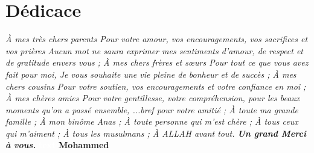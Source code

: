 \chapter*{Dédicace}
\begin{large}
\begin{center}
\centering

\noindent\textit{
À mes très chers parents 
\newline
Pour votre amour, vos encouragements, vos sacrifices et vos prières 
\newline
Aucun mot ne saura exprimer mes sentiments d’amour, de respect et de gratitude envers vous ; 
\newline
À mes chers frères et sœurs 
\newline
Pour tout ce que vous avez fait pour moi, Je vous souhaite une vie pleine de 
\newline
bonheur et de succès ; 
\newline
À mes chers cousins 
\newline
Pour votre soutien, vos encouragements et votre confiance en moi ; 
\newline
À mes chères amies 
\newline
Pour votre gentillesse, votre compréhension, pour les beaux moments qu’on a passé ensemble, ...bref pour votre amitié ; 
\newline
À toute ma grande famille ; 
\newline
À mon binôme Anas ; 
\newline
À toute personne qui m’est chère ; 
\newline
À tous ceux qui m’aiment ; 
\newline
À tous les musulmans ; 
\newline
À ALLAH avant tout. 
\newline
\newline
\textbf{Un grand Merci à vous.}
\newline
}
\newline
\raggedleft\textbf{\textcolor{white}{text}}
\hfill \textbf{Mohammed}
\end{center}
\end{large}
\clearpage